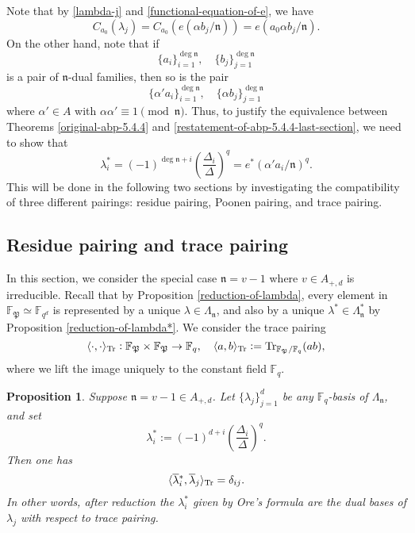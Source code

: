 \documentclass[11pt]{amsart}
\theoremstyle{plain}
\newtheorem{prop}[thm]{Proposition}
\theoremstyle{definition}
\theoremstyle{remark}
\numberwithin{equation}{section}
\newcommand{\FF}{\mathbb{F}}
\newcommand{\nfk}{\mathfrak{n}}
\newcommand{\Pfk}{\mathfrak{P}}
\newcommand{\Tr}{\operatorname{Tr}}
\newcommand{\ovl}{\overline}
\newcommand{\Fq}{\FF_q}
\newcommand{\Fqd}{\FF_{q^d}}
\DeclarePairedDelimiter{\angtr}{\langle}{\rangle_\textnormal{Tr}}
\begin{document}
	Note that by \eqref{lambda-j} and \eqref{functional-equation-of-e}, we have
	$$
	C_{a_0}(\lambda_j)
	= C_{a_0}(e(\alpha b_j/\nfk))
	= e(a_0 \alpha b_j/\nfk).
	$$
	On the other hand, note that if
	$$
	\{a_i\}_{i=1}^{\deg\nfk},
	\quad
	\{b_j\}_{j=1}^{\deg\nfk}
	$$
	is a pair of $\nfk$-dual families, then so is the pair
	$$
	\{\alpha' a_i\}_{i=1}^{\deg\nfk},
	\quad
	\{\alpha b_j\}_{j=1}^{\deg\nfk}
	$$
	where $\alpha' \in A$ with $\alpha\alpha' \equiv 1 \pmod{\nfk}$.
	Thus, to justify the equivalence between Theorems \ref{original-abp-5.4.4} and \ref{restatement-of-abp-5.4.4-last-section}, we need to show that
	\begin{equation}      \label{the-equation-of-the-main-goal}
		\lambda_i^*
		= (-1)^{\deg\nfk+i} \left(\frac{\Delta_i}{\Delta}\right)^q
		= e^*(\alpha' a_i/\nfk)^q.
	\end{equation}
	This will be done in the following two sections by investigating the compatibility of three different pairings: residue pairing, Poonen pairing, and trace pairing.
	
	\subsection{Residue pairing and trace pairing}  \label{section-residue-pairing-and-trace-pairing}
	
	In this section, we consider the special case $\nfk = v - 1$ where $v \in A_{+,d}$ is irreducible.
	Recall that by Proposition \ref{reduction-of-lambda}, every element in $\FF_\Pfk \simeq \Fqd$ is represented by a unique $\lambda \in \Lambda_\nfk$, and also by a unique $\lambda^* \in \Lambda_\nfk^*$ by Proposition \ref{reduction-of-lambda*}.
	We consider the trace pairing
	$$
	\angtr{\cdot,\cdot}: \FF_\Pfk \times \FF_\Pfk \to \Fq,
	\quad
	\angtr{a,b} := \Tr_{\FF_\Pfk/\Fq}(ab),
	$$
	where we lift the image uniquely to the constant field $\Fq$.
	
	\begin{prop}      \label{lambdai*-and-trace-pairing}
		Suppose $\nfk = v - 1 \in A_{+,d}$.
		Let $\{\lambda_j\}_{j=1}^{d}$ be any $\Fq$-basis of $\Lambda_\nfk$, and set
		$$
		\lambda_i^* 
		:= (-1)^{d+i} \left(\frac{\Delta_i}{\Delta}\right)^q.
		$$
		Then one has
		$$
		\angtr{\ovl{\lambda}{}^*_i , \ovl{\lambda}_j} = \delta_{ij}.
		$$
		In other words, after reduction the $\lambda_i^*$ given by Ore's formula are the dual bases of $\lambda_j$ with respect to trace pairing.
	\end{prop}
	
\end{document}
